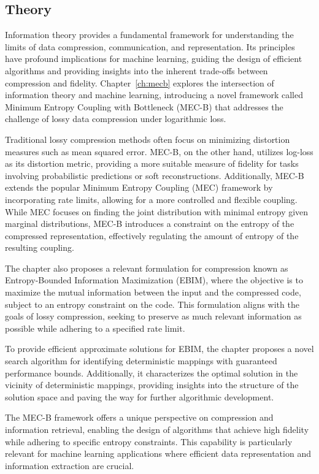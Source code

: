 \subsection{Theory}

Information theory provides a fundamental framework for understanding the limits of data compression, communication, and representation. Its principles have profound implications for machine learning, guiding the design of efficient algorithms and providing insights into the inherent trade-offs between compression and fidelity. Chapter~\ref{ch:mecb} explores the intersection of information theory and machine learning, introducing a novel framework called Minimum Entropy Coupling with Bottleneck (MEC-B) that addresses the challenge of lossy data compression under logarithmic loss.

Traditional lossy compression methods often focus on minimizing distortion measures such as mean squared error. MEC-B, on the other hand, utilizes log-loss as its distortion metric, providing a more suitable measure of fidelity for tasks involving probabilistic predictions or soft reconstructions. Additionally, MEC-B extends the popular Minimum Entropy Coupling (MEC) framework by incorporating rate limits, allowing for a more controlled and flexible coupling. While MEC focuses on finding the joint distribution with minimal entropy given marginal distributions, MEC-B introduces a constraint on the entropy of the compressed representation, effectively regulating the amount of entropy of the resulting coupling.

The chapter also proposes a relevant formulation for compression known as Entropy-Bounded Information Maximization (EBIM), where the objective is to maximize the mutual information between the input and the compressed code, subject to an entropy constraint on the code. This formulation aligns with the goals of lossy compression, seeking to preserve as much relevant information as possible while adhering to a specified rate limit.

To provide efficient approximate solutions for EBIM, the chapter proposes a novel search algorithm for identifying deterministic mappings with guaranteed performance bounds. Additionally, it characterizes the optimal solution in the vicinity of deterministic mappings, providing insights into the structure of the solution space and paving the way for further algorithmic development.

The MEC-B framework offers a unique perspective on compression and information retrieval, enabling the design of algorithms that achieve high fidelity while adhering to specific entropy constraints. This capability is particularly relevant for machine learning applications where efficient data representation and information extraction are crucial.


